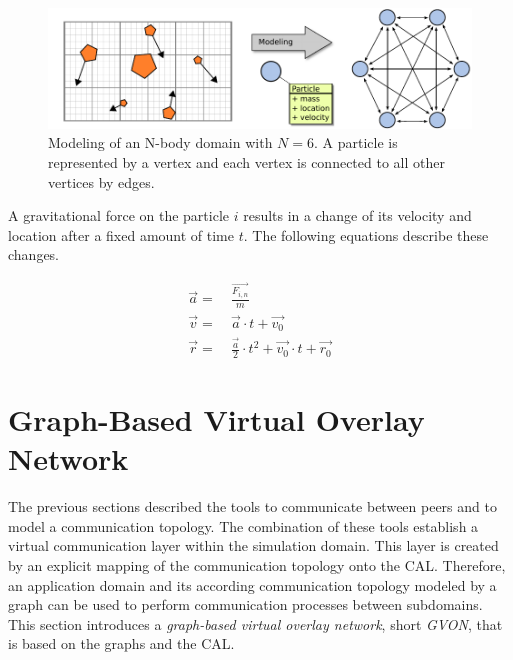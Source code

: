 \begin{figure}[H]
  \centering \includegraphics[width=\textwidth]{graphics/30_nbody_modeling}
  \caption{Modeling of an N-body domain with $N = 6$. A particle is
    represented by a vertex and each vertex is connected to all other
    vertices by edges.}
  \label{fig:nbody_modeling}
\end{figure}

\noindent A gravitational force on the particle $i$ results in a change of its velocity and
location after a fixed amount of time $t$. The following equations describe these
changes.

\begin{align}
  \label{eq:n_body_update}
  \overrightarrow{a} =&~ \frac{\overrightarrow{F_{i,n}}}{m}\\
  \overrightarrow{v} =&~ \overrightarrow{a} \cdot t + \overrightarrow{v_0}\\
  \overrightarrow{r} =&~ \frac{\overrightarrow{a}}{2} \cdot t^2 + \overrightarrow{v_0} \cdot t + \overrightarrow{r_0}
\end{align}


\section{Graph-Based Virtual Overlay Network}
\label{sec:gvon}
The previous sections described the tools to communicate between
peers and to model a communication topology. The combination of these
tools establish a virtual communication layer within the simulation
domain. This layer is created by an explicit mapping of the
communication topology onto the CAL. Therefore, an application domain and its according
communication topology modeled by a graph can be used to perform
communication processes between subdomains.  This section introduces a
\emph{graph-based virtual overlay network}, short \emph{GVON},
that is based on the graphs and the CAL.

